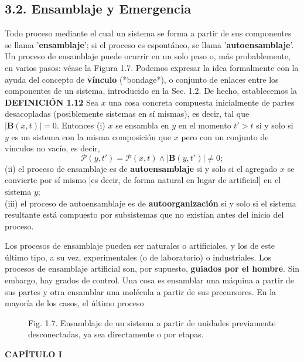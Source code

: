 {\fontsize{13}{15}\selectfont
\subsection*{3.2. Ensamblaje y Emergencia}
Todo proceso mediante el cual un sistema se forma a partir de sus componentes se llama '\textbf{ensamblaje}'; si el proceso es espontáneo, se llama '\textbf{autoensamblaje}'. Un proceso de ensamblaje puede ocurrir en un solo paso o, más probablemente, en varios pasos: véase la Figura 1.7. Podemos expresar la idea formalmente con la ayuda del concepto de \textbf{vínculo} (*bondage*), o conjunto de enlaces entre los componentes de un sistema, introducido en la Sec. 1.2. De hecho, establecemos la
\\
\textbf{DEFINICIÓN 1.12} Sea $x$ una cosa concreta compuesta inicialmente de partes desacopladas (posiblemente sistemas en sí mismas), es decir, tal que $|\mathbf{B}(x, t)| = 0$. Entonces
(i) $x$ se ensambla en $y$ en el momento $t' > t$ si y solo si $y$ es un sistema con la misma composición que $x$ pero con un conjunto de vínculos no vacío, es decir,
$$ \mathcal{P}(y, t') = \mathcal{P}(x, t) \land |\mathbf{B}(y, t')| \ne 0; $$
(ii) el proceso de ensamblaje es de \textbf{autoensamblaje} si y solo si el agregado $x$ se convierte por sí mismo [es decir, de forma natural en lugar de artificial] en el sistema $y$;
\\
(iii) el proceso de autoensamblaje es de \textbf{autoorganización} si y solo si el sistema resultante está compuesto por subsistemas que no existían antes del inicio del proceso.

Los procesos de ensamblaje pueden ser naturales o artificiales, y los de este último tipo, a su vez, experimentales (o de laboratorio) o industriales. Los procesos de ensamblaje artificial son, por supuesto, \textbf{guiados por el hombre}. Sin embargo, hay grados de control. Una cosa es ensamblar una máquina a partir de sus partes y otra ensamblar una molécula a partir de sus precursores. En la mayoría de los casos, el último proceso
}

\begin{figure}[h!]
    \centering

    \caption*{Fig. 1.7. Ensamblaje de un sistema a partir de unidades previamente desconectadas, ya sea directamente o por etapas.}
\end{figure}

\newpage
\fancyhf{}
\fancyhead[l]{\thepage}
\begin{center}
{\fontsize{13}{16}\selectfont \textbf{CAPÍTULO I}}
\end{center}
\vspace{0.5cm}

